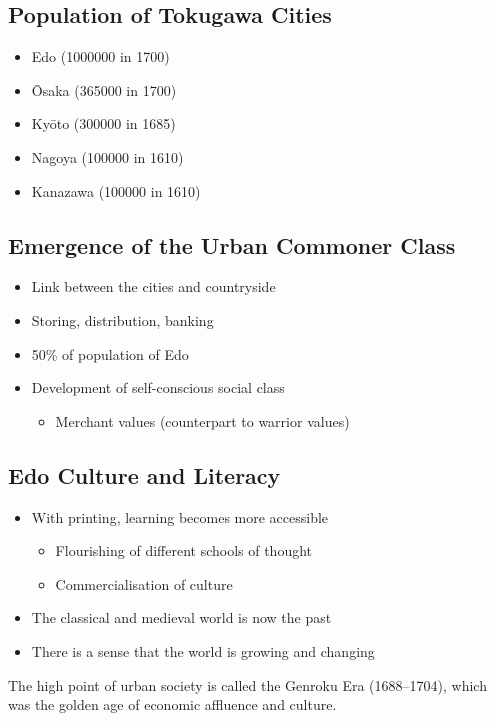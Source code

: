 \documentclass[class=article, crop=false]{standalone}
\begin{document}
  \subsection{Population of Tokugawa Cities}
  \begin{itemize}
    \item Edo (1000000 in 1700)
    \item \=Osaka (365000 in 1700)
    \item Ky\=oto (300000 in 1685)
    \item Nagoya (100000 in 1610)
    \item Kanazawa (100000 in 1610)
  \end{itemize}
  \subsection{Emergence of the Urban Commoner Class}
  \begin{itemize}
    \item Link between the cities and countryside
    \item Storing, distribution, banking
    \item 50\% of population of Edo
    \item Development of self-conscious social class
    \begin{itemize}
      \item Merchant values (counterpart to warrior values)
    \end{itemize}
  \end{itemize}
  \subsection{Edo Culture and Literacy}
  \begin{itemize}
    \item With printing, learning becomes more accessible
    \begin{itemize}
      \item Flourishing of different schools of thought
      \item Commercialisation of culture
    \end{itemize}
    \item The classical and medieval world is now the past
    \item There is a sense that the world is growing and changing
  \end{itemize}
  \begin{note}{}
    The high point of urban society is called the Genroku Era (1688--1704), which was the golden age of economic affluence and culture.
  \end{note}
\end{document}
